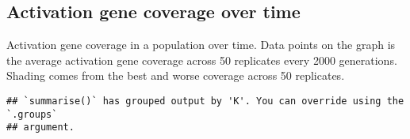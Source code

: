 \documentclass[]{book}
\newenvironment{Shaded}{\begin{snugshade}}{\end{snugshade}}
\newcommand{\DataTypeTok}[1]{\textcolor[rgb]{0.13,0.29,0.53}{#1}}
\newcommand{\KeywordTok}[1]{\textcolor[rgb]{0.13,0.29,0.53}{\textbf{#1}}}
\newcommand{\NormalTok}[1]{#1}
\newcommand{\OperatorTok}[1]{\textcolor[rgb]{0.81,0.36,0.00}{\textbf{#1}}}
\newcommand{\StringTok}[1]{\textcolor[rgb]{0.31,0.60,0.02}{#1}}
\begin{document}
\hypertarget{activation-gene-coverage-over-time-11}{%
\subsection{Activation gene coverage over time}\label{activation-gene-coverage-over-time-11}}

Activation gene coverage in a population over time.
Data points on the graph is the average activation gene coverage across 50 replicates every 2000 generations.
Shading comes from the best and worse coverage across 50 replicates.

\begin{Shaded}
\end{Shaded}

\begin{verbatim}
## `summarise()` has grouped output by 'K'. You can override using the `.groups`
## argument.
\end{verbatim}
\end{document}
